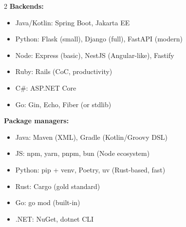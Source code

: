 \documentclass[11pt, letterpaper]{article}
\begin{document}
\begin{tcolorbox}[colback=part8bg, colframe=sectionbrown,
  title={\bfseries Backend Frameworks \& Build Tools}, arc=3pt, boxrule=1pt]
\footnotesize
\begin{multicols}{2}
\textbf{Backends:}
\begin{itemize}[noitemsep, leftmargin=*]
  \item Java/Kotlin: Spring Boot, Jakarta EE
  \item Python: Flask (small), Django (full), FastAPI (modern)
  \item Node: Express (basic), NestJS (Angular-like), Fastify
  \item Ruby: Rails (CoC, productivity)
  \item C\#: ASP.NET Core
  \item Go: Gin, Echo, Fiber (or stdlib)
\end{itemize}
\columnbreak
\textbf{Package managers:}
\begin{itemize}[noitemsep, leftmargin=*]
  \item Java: Maven (XML), Gradle (Kotlin/Groovy DSL)
  \item JS: npm, yarn, pnpm, bun (Node ecosystem)
  \item Python: pip + venv, Poetry, uv (Rust-based, fast)
  \item Rust: Cargo (gold standard)
  \item Go: go mod (built-in)
  \item .NET: NuGet, dotnet CLI
\end{itemize}
\end{multicols}
\end{tcolorbox}

\vspace{4pt}
\end{document}
